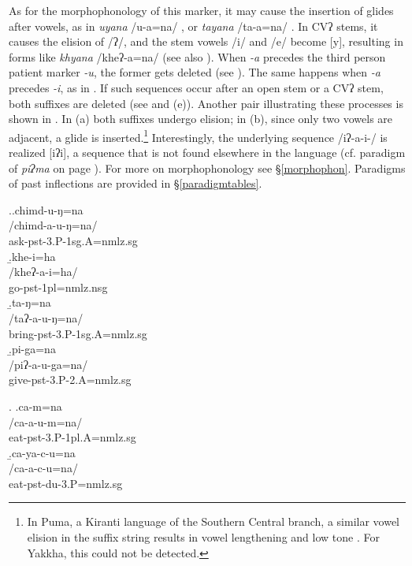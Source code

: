 As for the morphophonology of this marker, it may cause the insertion of glides after vowels, as in \emph{uyana} /u-a=na/ , or \emph{tayana} /ta-a=na/ . In CVʔ stems, it causes the elision of /ʔ/, and the stem vowels /i/ and /e/ become [y], resulting in forms like   \emph{khyana} /kheʔ-a=na/  (see also \Last[a]).  When \emph{-a} precedes the third person patient marker \emph{-u}, the former gets deleted (see \Next[a]). The same happens when \emph{-a} precedes \emph{-i}, as in \Next[b]. If such sequences occur after an open stem or a CVʔ stem, both suffixes are deleted (see \Next[c] and (e)). Another pair illustrating these processes is shown in \NNext. In (a) both suffixes undergo elision; in (b), since only two vowels are adjacent, a glide is inserted.\footnote{In Puma, a Kiranti language of the Southern Central branch, a similar vowel elision in the suffix string results in vowel lengthening and low tone \citep{Bickeletal2006The-Chintang}. For Yakkha, this could not be detected.} Interestingly, the underlying sequence /iʔ-a-i-/ is realized [iʔi], a sequence that is not found elsewhere in the language (cf. paradigm of \emph{piʔma}  on page \pageref{par-pipma-pst}). For more on morphophonology see §\ref{morphophon}. Paradigms of past inflections are provided in §\ref{paradigmtables}.

\ex.\a.\glll chimd-u-ŋ=na\\
 /chimd-a-u-ŋ=na/\\
ask{\sc -pst-3.P-1sg.A=nmlz.sg}\\
\b.\glll khe-i=ha\\
 /kheʔ-a-i=ha/\\
go{\sc -pst-1pl=nmlz.nsg}\\
\b.\glll ta-ŋ=na \\
/taʔ-a-u-ŋ=na/\\
bring{\sc -pst-3.P-1sg.A=nmlz.sg}\\
\b.\glll pi-ga=na \\
/piʔ-a-u-ga=na/\\
give{\sc -pst-3.P-2.A=nmlz.sg}\\

\ex. \a.\glll ca-m=na\\
 /ca-a-u-m=na/\\
eat{\sc -pst-3.P-1pl.A=nmlz.sg}\\
\b.\glll ca-ya-c-u=na \\
/ca-a-c-u=na/\\
eat{\sc -pst-du-3.P=nmlz.sg}\\


